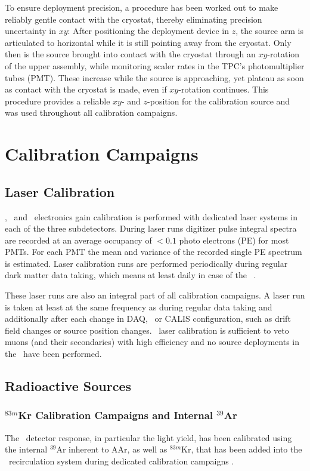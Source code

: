To ensure deployment precision, a procedure has been worked out to make reliably gentle contact with the cryostat, thereby eliminating precision uncertainty in $xy$: After positioning the deployment device in $z$, the source arm is articulated to horizontal while it is still pointing away from the cryostat. Only then is the source brought into contact with the cryostat through an $xy$-rotation of the upper assembly, while monitoring scaler rates in the TPC's photomultiplier tubes (PMT).  These increase while the source is approaching, yet plateau as soon as contact with the cryostat is made, even if $xy$-rotation continues. This procedure provides a reliable $xy$- and $z$-position for the calibration source and was used throughout all calibration campaigns.


\section{Calibration Campaigns}\label{sec:CalibCampaigns}
\subsection{Laser Calibration}
\wcv, \lsv\ and \tpc\ electronics gain calibration is performed with dedicated laser systems in each of the three subdetectors. During laser runs digitizer pulse integral spectra are recorded at an average occupancy of $< 0.1$ photo electrons (PE) for most PMTs. For each PMT  the mean and variance of the recorded single PE spectrum is estimated. Laser calibration runs are performed periodically during regular dark matter data taking, which means at least daily in case of the \tpc\ \cite{Agnes:2015gu}. 

These laser runs are also an integral part of all calibration campaigns. A laser run is taken at least at the same frequency as during regular data taking and additionally after each change in DAQ, \tpc\ or CALIS configuration, such as drift field changes or source position changes. \wcv\ laser calibration is sufficient to veto muons (and their secondaries) with high efficiency and no source deployments in the \wcv\ have been performed.

\subsection{Radioactive Sources}
\subsubsection{$^{83m}$Kr Calibration Campaigns and Internal $^{39}$Ar}
The \tpc\ detector response, in particular the light yield, has been calibrated using the internal $^{39}$Ar inherent to AAr, as well as $^{83m}$Kr, that has been added into the \lar\ recirculation system during dedicated calibration campaigns \cite{Agnes:2015gu}.


